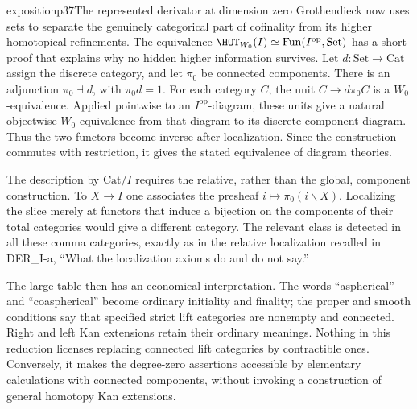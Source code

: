 \begin{dcomment}{exposition}{p37}{The represented derivator at dimension zero}
Grothendieck now uses sets to separate the genuinely categorical part of cofinality from its higher homotopical refinements. The equivalence $\HOT_{W_0}(I)\simeq\operatorname{Fun}(I^{\mathrm{op}},\mathrm{Set})$ has a short proof that explains why no hidden higher information survives. Let $d:\mathrm{Set}\longrightarrow\mathrm{Cat}$ assign the discrete category, and let $\pi_0$ be connected components. There is an adjunction $\pi_0\dashv d$, with $\pi_0d=1$. For each category $C$, the unit $C\longrightarrow d\pi_0C$ is a $W_0$-equivalence. Applied pointwise to an $I^{\mathrm{op}}$-diagram, these units give a natural objectwise $W_0$-equivalence from that diagram to its discrete component diagram. Thus the two functors become inverse after localization. Since the construction commutes with restriction, it gives the stated equivalence of diagram theories.

The description by $\mathrm{Cat}/I$ requires the relative, rather than the global, component construction. To $X\longrightarrow I$ one associates the presheaf $i\longmapsto\pi_0(i\backslash X)$. Localizing the slice merely at functors that induce a bijection on the components of their total categories would give a different category. The relevant class is detected in all these comma categories, exactly as in the relative localization recalled in DER\_I-a, ``What the localization axioms do and do not say.''

The large table then has an economical interpretation. The words ``aspherical'' and ``coaspherical'' become ordinary initiality and finality; the proper and smooth conditions say that specified strict lift categories are nonempty and connected. Right and left Kan extensions retain their ordinary meanings. Nothing in this reduction licenses replacing connected lift categories by contractible ones. Conversely, it makes the degree-zero assertions accessible by elementary calculations with connected components, without invoking a construction of general homotopy Kan extensions.
\end{dcomment}

